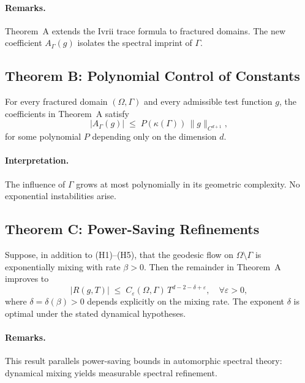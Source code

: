 \paragraph{Remarks.}
Theorem~A extends the Ivrii trace formula to fractured domains. The new
coefficient $A_\Gamma(g)$ isolates the spectral imprint of $\Gamma$.

\subsection{Theorem B: Polynomial Control of Constants}

\begin{proposition}
For every fractured domain $(\Omega,\Gamma)$ and every admissible test function
$g$, the coefficients in Theorem~A satisfy
\[
|A_\Gamma(g)| \;\leq\; P(\kappa(\Gamma))\,\|g\|_{C^{d+1}},
\]
for some polynomial $P$ depending only on the dimension $d$.
\end{proposition}

\paragraph{Interpretation.}
The influence of $\Gamma$ grows at most polynomially in its geometric
complexity. No exponential instabilities arise.

\subsection{Theorem C: Power-Saving Refinements}

\begin{theoremC}
Suppose, in addition to (H1)--(H5), that the geodesic flow on
$\Omega\setminus\Gamma$ is exponentially mixing with rate $\beta>0$. Then the
remainder in Theorem~A improves to
\[
|R(g,T)| \;\leq\; C_\varepsilon(\Omega,\Gamma)\,
T^{d-2-\delta+\varepsilon}, \quad \forall \varepsilon>0,
\]
where $\delta=\delta(\beta)>0$ depends explicitly on the mixing rate. The
exponent $\delta$ is optimal under the stated dynamical hypotheses.
\end{theoremC}

\paragraph{Remarks.}
This result parallels power-saving bounds in automorphic spectral theory:
dynamical mixing yields measurable spectral refinement.


